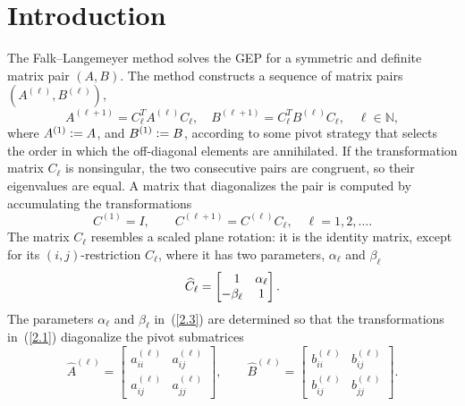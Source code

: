 \section{Introduction}
\label{sec:Metho:intro}
%
%
%
The Falk--Langemeyer method solves the GEP for a symmetric
and definite matrix pair $(A, B)$.  The method constructs a sequence of
matrix pairs $(A^{(\ell)}, B^{(\ell)})$,
\begin{equation}
  A_{}^{(\ell+1)} = C_{\ell}^T A_{}^{(\ell)} C_{\ell}^{}, \quad
  B_{}^{(\ell+1)} = C_{\ell}^T B_{}^{(\ell)} C_{\ell}^{}, \quad \ell \in \mathbb{N},
\label{2.1}
\end{equation}
where $A^{(1)} \mathrel{\mathop:}= A$, and $B^{(1)} \mathrel{\mathop:}= B$, according to some pivot
strategy that selects the order in which the off-diagonal elements are
annihilated.
If the transformation matrix $C_{\ell}$ is nonsingular, the two consecutive
pairs are congruent, so their eigenvalues are equal.
A matrix that diagonalizes the pair is computed by accumulating
the transformations
\begin{equation}
  C^{(1)} = I, \qquad C^{(\ell+1)} = C^{(\ell)} C_{\ell}, \quad
  \ell = 1, 2, \ldots.
\label{2.2}
\end{equation}
The matrix $C_{\ell}$ resembles a scaled plane rotation: it is the identity
matrix, except for its $(i, j)$-restriction $\widehat{C}_{\ell}$, where
it has two parameters, $\alpha_{\ell}$ and $\beta_{\ell}$
\begin{equation}
  \widehat{C}_{\ell} = \begin{bmatrix}
    \hphantom{-}1 & \alpha_{\ell} \\
    -\beta_{\ell}      & 1
  \end{bmatrix}.
\label{2.3}
\end{equation}
The parameters $\alpha_{\ell}$ and $\beta_{\ell}$ in~(\ref{2.3}) are
determined so that the transformations in~(\ref{2.1}) diagonalize
the pivot submatrices
\begin{equation}
  \widehat{A}^{(\ell)} =
  \begin{bmatrix}
    a_{ii}^{(\ell)} & a_{ij}^{(\ell)} \\[2pt]
    a_{ij}^{(\ell)} & a_{jj}^{(\ell)}
  \end{bmatrix}, \qquad
  \widehat{B}^{(\ell)} =
  \begin{bmatrix}
    b_{ii}^{(\ell)} & b_{ij}^{(\ell)} \\[2pt]
    b_{ij}^{(\ell)} & b_{jj}^{(\ell)}
  \end{bmatrix}.
\label{2.4}
\end{equation}
%
%
